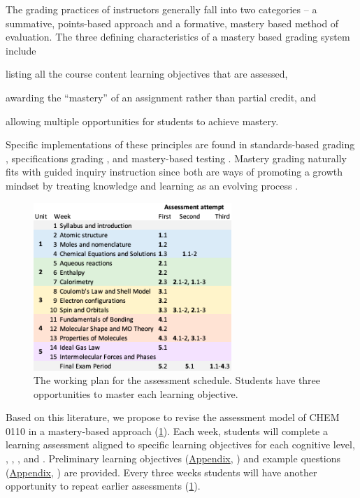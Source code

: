 \documentclass[10pt,letterpaper]{article}
\begin{document}
The grading practices of instructors generally fall into two categories -- a summative, points-based approach and a formative, mastery based method of evaluation. The three defining characteristics of a mastery based grading system include   \citep{Kelly2020} \begin{enumerate*}[label=\textbf{\arabic*).},nosep]
\item listing all the course content learning objectives that are assessed, 
\item awarding the
  ``mastery'' of an assignment rather than partial credit, and
  \item allowing multiple opportunities for students to achieve mastery.
\end{enumerate*}
Specific implementations of these principles are found in standards-based grading \citep{Marzano2011}, specifications grading \citep{Nilson2015}, and mastery-based testing \citep{Collins2019}. Mastery grading naturally fits with guided inquiry instruction since both are ways of promoting a growth mindset by treating knowledge and learning as an evolving process \cite{selbach2020}.

%
%

\begin{figure}
\includegraphics[width=7.5cm]{schedule.png}
\caption{\label{fig:schedule}
The working plan for the assessment schedule. Students have three opportunities to master each learning objective.}
\end{figure}

Based on this literature, we propose to revise the assessment model of CHEM 0110 in a mastery-based approach (\cref{fig:schedule}). Each week, students will complete a learning assessment aligned to specific learning objectives for each cognitive level, \recall, \comprehension, \analysis, and \use. Preliminary learning objectives (\hyperref[app:learning_objectives]{Appendix}, ) and example questions (\hyperref[app:example_questions]{Appendix}, ) are provided. Every three weeks students will have another opportunity to repeat earlier assessments (\cref{fig:schedule}). 
\end{document}
